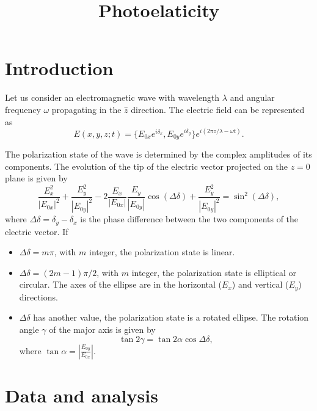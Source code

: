 \documentclass{article}
\title{Photoelaticity}
\begin{document}
\maketitle

\section{Introduction}

\noindent Let us consider an electromagnetic wave with wavelength $\lambda$ and angular frequency $\omega$ propagating in the $\hat{z}$ direction. The electric field can be represented as
\begin{equation}
E(x,y,z;t) = \{E_{0x}e^{i\delta_x}, E_{0y}e^{i\delta_y}\}e^{i(2\pi z/\lambda - \omega t)}.
\end{equation}

\noindent The polarization state of the wave is determined by the complex amplitudes of its components. The evolution of the tip of the electric vector projected on the $z=0$ plane is given by
\begin{equation}
\frac{E_x^2}{|E_{0x}|^2} + \frac{E_y^2}{|E_{0y}|^2} - 2\frac{E_x}{|E_{0x}|}\frac{E_y}{|E_{0y}|}\cos(\Delta \delta) + \frac{E_y^2}{|E_{0y}|^2} = \sin^2(\Delta \delta),
\end{equation}
where $\Delta \delta = \delta_y - \delta_x$ is the phase difference between the two components of the electric vector. If

\begin{itemize}
    \item $\Delta \delta = m\pi$, with $m$ integer, the polarization state is linear.
    \item $\Delta \delta = (2m-1)\pi/2$, with $m$ integer, the polarization state is elliptical or circular. The axes of the ellipse are in the horizontal ($E_x$) and vertical ($E_y$) directions.
    \item $\Delta \delta$ has another value, the polarization state is a rotated ellipse. The rotation angle $\gamma$ of the major axis is given by
    \begin{equation}
    \tan 2\gamma = \tan 2\alpha \cos \Delta \delta,
    \end{equation}
    where $\tan \alpha = \left|\frac{E_{0y}}{E_{0x}}\right|$.
\end{itemize}

\section{Data and analysis}
\end{document}
